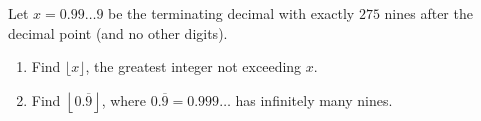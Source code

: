 Let $x=0.99\ldots9$ be the terminating decimal with exactly $275$ nines after the decimal point (and no other digits).
\begin{enumerate}
\item[(a)] Find $\lfloor x\rfloor$, the greatest integer not exceeding $x$.
\item[(b)] Find $\left\lfloor0.\overline{9}\right\rfloor$, where $0.\overline{9}=0.999\ldots$ has infinitely many nines.
\end{enumerate}

